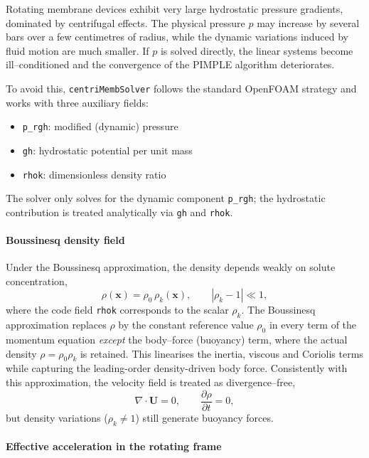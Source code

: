 \documentclass[11pt,a4paper]{article}
\begin{document}
Rotating membrane devices exhibit very large hydrostatic pressure
gradients, dominated by centrifugal effects. The physical pressure
\(p\) may increase by several bars over a few centimetres of radius,
while the dynamic variations induced by fluid motion are much smaller.
If \(p\) is solved directly, the linear systems become ill–conditioned
and the convergence of the PIMPLE algorithm deteriorates.

To avoid this, \texttt{centriMembSolver} follows the standard OpenFOAM
strategy and works with three auxiliary fields:

\begin{itemize}
	\item \texttt{p\_rgh}: modified (dynamic) pressure
	\item \texttt{gh}: hydrostatic potential per unit mass
	\item \texttt{rhok}: dimensionless density ratio
\end{itemize}

The solver only solves for the dynamic component \texttt{p\_rgh}; the
hydrostatic contribution is treated analytically via \texttt{gh} and
\texttt{rhok}.

\paragraph{Boussinesq density field}

Under the Boussinesq approximation, the density depends weakly on
solute concentration,
\begin{equation}
	\rho(\boldsymbol{x}) = \rho_0\,\rho_k(\boldsymbol{x}),
	\qquad
	|\rho_k - 1| \ll 1,
\end{equation}
where the code field \texttt{rhok} corresponds to the scalar
\(\rho_k\). The Boussinesq approximation replaces \(\rho\) by the
constant reference value \(\rho_0\) in every term of the momentum
equation \emph{except} the body--force (buoyancy) term, where the
actual density \(\rho = \rho_0\rho_k\) is retained.  This linearises
the inertia, viscous and Coriolis terms while capturing the
leading-order density-driven body force.  Consistently with this
approximation, the velocity field is treated as divergence--free,
\begin{equation}
	\nabla\cdot\boldsymbol{U} = 0,
	\qquad
	\frac{\partial \rho}{\partial t} = 0,
\end{equation}
but density variations (\(\rho_k \neq 1\)) still generate buoyancy forces.

\paragraph{Effective acceleration in the rotating frame}
\end{document}
